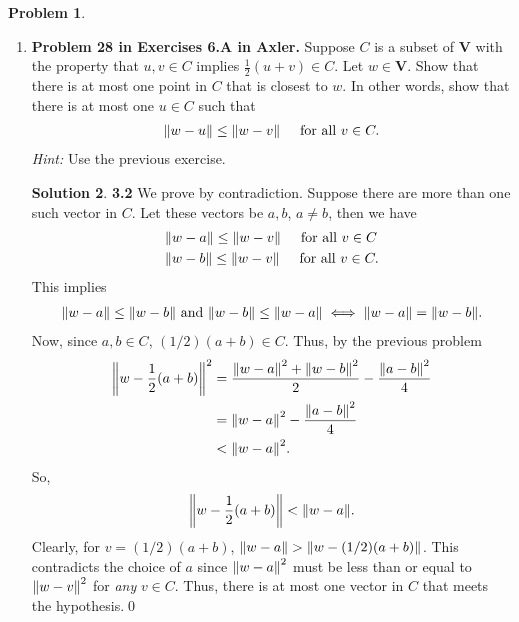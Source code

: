 \documentclass{book}
\theoremstyle{definition}
\newtheorem*{prob*}{Problem}
\newtheorem*{sln*}{Solution}
\newcommand{\V}{\mathbf{V}}
\begin{document}
\begin{prob*}
\begin{enumerate}
\begin{sln*}
		\end{sln*}
		
		
		
		\newpage
		
		
		
		\item \textbf{Problem 28 in Exercises 6.A in Axler.} Suppose $C$ is a subset of $\V$ with the property that $u,v \in C$ implies $\frac{1}{2}(u+v) \in C$. Let $w\in \V$. Show that there is at most one point in $C$ that is closest to $w$. In other words, show that there is at most one $u \in C$ such that
		\begin{align*}
		\norm{w-u} \leq \norm{w-v} \hspace{0.5cm} \text{for all } v\in C.
		\end{align*}
		\textit{Hint:} Use the previous exercise. 
		
		\begin{sln*}\textbf{3.2} 
			We prove by contradiction. Suppose there are more than one such vector in $C$. Let these vectors be $a,b$, $a\neq b$, then we have
			\begin{align*}
			&\norm{w-a} \leq \norm{w-v} \hspace{0.5cm} \text{for all } v\in C\\
			&\norm{w-b} \leq \norm{w-v} \hspace{0.5cm} \text{for all } v\in C.
			\end{align*}   
			This implies
			\begin{align*}
			\norm{w-a} \leq \norm{w-b} \text{ and } \norm{w-b} \leq \norm{w-a} \iff \norm{w-a} = \norm{w-b}.
			\end{align*}
			Now, since $a,b\in C$, $(1/2)(a+b) \in C$. Thus, by the previous problem
			\begin{align*}
			\norm{w - \frac{1}{2}(a+b)}^2 &= \frac{\norm{w-a}^2 + \norm{w-b}^2}{2} - \frac{\norm{a-b}^2}{4}\\ 
			&= \norm{w-a}^2 - \frac{\norm{a-b}^2}{4} \\
			&< \norm{w-a}^2.
			\end{align*}
			So,
			\begin{align*}
			\norm{w - \frac{1}{2}(a+b)} < \norm{w-a}.
			\end{align*}
			Clearly, for $v = (1/2)(a+b)$, $\norm{w-a} > \norm{w - (1/2)(a+b)}$. This contradicts the choice of $a$ since $\norm{w-a}^2$ must be less than or equal to $\norm{w-v}^2$ for \textit{any} $v\in C$. Thus, there is at most one vector in $C$ that meets the hypothesis.\qed
		\end{sln*}
		
		
	\end{enumerate}
	
\end{prob*}
\end{document}
